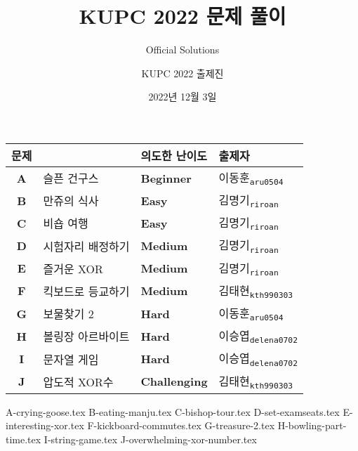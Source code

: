 
\usetikzlibrary{arrows.meta,matrix,decorations.pathreplacing}

\title{KUPC 2022 문제 풀이}
\subtitle{Official Solutions}
\author{KUPC 2022 출제진}
\date{2022년 12월 3일}


    \setcounter{framenumber}{-1}
    \frame{\titlepage}
        
    \begin{frame} %
        \begin{center}
            \begin{tabular}{cl|l|l}
                \hline
                문제 & & 의도한 난이도 & 출제자 \\
                \hline
                \hline

		\textbf{A} & 슬픈 건구스 & \textbf{\color{acbronze}Beginner} & 이동훈\textsubscript{\color{kupc-gray}\texttt{aru0504}} \\
                \textbf{B} & 만쥬의 식사& \textbf{\color{acbronze}Easy} & 김명기\textsubscript{\color{kupc-gray}\texttt{riroan}} \\
                \textbf{C} & 비숍 여행 & \textbf{\color{acbronze}Easy} & 김명기\textsubscript{\color{kupc-gray}\texttt{riroan}} \\
                \textbf{D} & 시험자리 배정하기 & \textbf{\color{acsilver}Medium} & 김명기\textsubscript{\color{kupc-gray}\texttt{riroan}} \\
                \textbf{E} & 즐거운 XOR & \textbf{\color{acsilver}Medium} & 김명기\textsubscript{\color{kupc-gray}\texttt{riroan}} \\
                \textbf{F} & 킥보드로 등교하기 & \textbf{\color{acsilver}Medium} & 김태현\textsubscript{\color{kupc-gray}\texttt{kth990303}} \\
                \textbf{G} & 보물찾기 2 & \textbf{\color{acgold}Hard} & 이동훈\textsubscript{\color{kupc-gray}\texttt{aru0504}} \\
                \textbf{H} & 볼링장 아르바이트 & \textbf{\color{acgold}Hard} & 이승엽\textsubscript{\color{kupc-gray}\texttt{delena0702}}\\
                \textbf{I} & 문자열 게임 & \textbf{\color{acgold}Hard} & 이승엽\textsubscript{\color{kupc-gray}\texttt{delena0702}} \\
                \textbf{J} & 압도적 XOR수 & \textbf{\color{acgold}Challenging} & 김태현\textsubscript{\color{kupc-gray}\texttt{kth990303}} \\

                \hline
            \end{tabular}
        \end{center}
    \end{frame}
    {A-crying-goose.tex}
    {B-eating-manju.tex}
    {C-bishop-tour.tex}
    {D-set-examseats.tex}
    {E-interesting-xor.tex}
    {F-kickboard-commutes.tex}
    {G-treasure-2.tex}
    {H-bowling-part-time.tex}
    {I-string-game.tex}
    {J-overwhelming-xor-number.tex}


